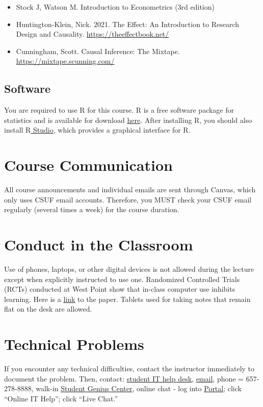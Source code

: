 \documentclass{./../Latex/syllabus}
\begin{document}
\begin{itemize}
\item Stock J, Watson M. Introduction to Econometrics (3rd edition) 
\item Huntington-Klein, Nick. 2021. The Effect: An Introduction to Research Design and Causality. \href{https://theeffectbook.net/}{https://theeffectbook.net/}
\item Cunningham, Scott. Causal Inference: The Mixtape. \href{https://mixtape.scunning.com/}{https://mixtape.scunning.com/}
\end{itemize}

\subsection*{Software}
You are required to use $\mathrm{R}$ for this course. $\mathrm{R}$ is a free software package for statistics and is available for download \href{https://www.r-project.org}{here}. After installing $\mathrm{R}$, you should also install \href{https://posit.co/download/rstudio-desktop/}{$\mathrm{R}$ Studio}, which provides a graphical interface for $\mathrm{R}$.


\section*{Course Communication}
All course announcements and individual emails are sent through Canvas, which only uses CSUF email accounts. Therefore, you MUST check your CSUF email regularly (several times a week) for the course duration.

\section*{Conduct in the Classroom}
Use of phones, laptops, or other digital devices is not allowed during the lecture except when explicitly instructed to use one. Randomized Controlled Trials (RCTs) conducted at West Point show that in-class computer use inhibits learning. Here is a \href{https://oema.army.mil/pub/2017_Carter_Greenberg_Walker_Computer_Usage_RCT_USMA.pdf}{link} to the paper. Tablets used for taking notes that remain flat on the desk are allowed.

\section*{Technical Problems}
If you encounter any technical difficulties, contact the instructor immediately to document the problem. Then, contact: \href{https://www.fullerton.edu/it/services/helpdesk/}{student IT help desk}, \href{mailto:StudentITHelpDesk@fullerton.edu}{email}, phone = 657-278-8888, walk-in \href{http://www.fullerton.edu/it/students/sgc/index.php}{Student Genius Center}, online chat - log into \href{http://my.fullerton.edu}{Portal}; click ``Online IT Help''; click ``Live Chat.''
\end{document}
